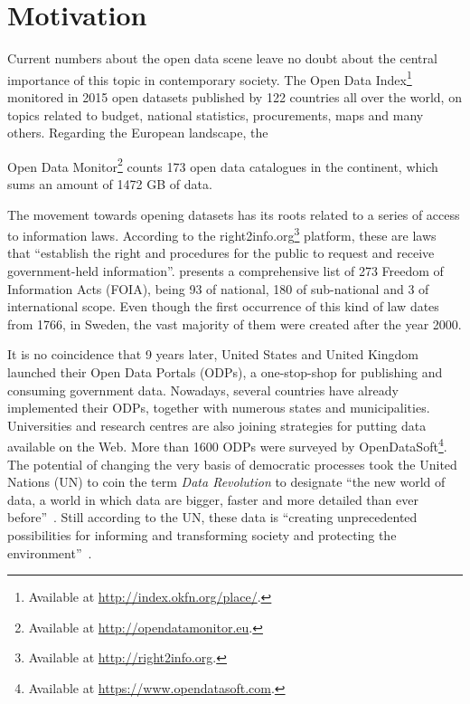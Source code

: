 \section{Motivation}
Current numbers about the open data scene leave no doubt about the central importance of this topic in contemporary society.
The Open Data Index\footnote{Available at \url{http://index.okfn.org/place/}.} monitored in 2015 open datasets published by 122 countries all over the world, on topics related to budget, national statistics, procurements, maps and many others.
Regarding the European landscape, the {Open Data Monitor\footnote{Available at \url{http://opendatamonitor.eu}.} counts 173 open data catalogues in the continent, which sums an amount of 1472 GB of data.

The movement towards opening datasets has its roots related to a series of access to information laws. 
According to the right2info.org\footnote{Available at \url{http://right2info.org}.} platform, these are laws that ``establish the right and procedures for the public to request and receive government-held information''.
 presents a comprehensive list of 273 Freedom of Information Acts (FOIA), being 93 of national, 180 of sub-national and 3 of international scope.
Even though the first occurrence of this kind of law dates from 1766, in Sweden, the vast majority of them were created after the year 2000.

It is no coincidence that 9 years later, United States and United Kingdom launched their Open Data Portals (ODPs), a one-stop-shop for publishing and consuming government data.
Nowadays, several countries have already implemented their ODPs, together with numerous states and municipalities.
Universities and research centres are also joining strategies for putting data available on the Web.
More than 1600 ODPs were surveyed by OpenDataSoft\footnote{Available at \url{https://www.opendatasoft.com}.}.
The potential of changing the very basis of democratic processes took the United Nations (UN) to coin the term \emph{Data Revolution} to designate ``the new world of data, a world in which data are bigger, faster and more detailed than ever before''~\cite[p.4]{DataRevolutionGroup2014}.
Still according to the UN, these data is ``creating unprecedented possibilities for informing and transforming society and protecting the environment''~\cite[p.4]{DataRevolutionGroup2014}.

}
